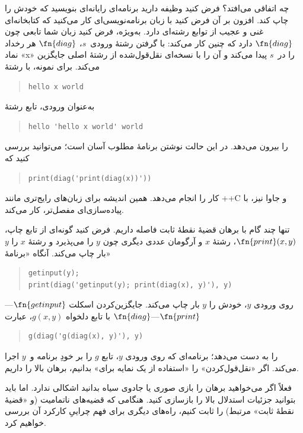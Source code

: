 \documentclass[../../../include/open-logic-section]{subfiles}
\begin{document}
\begin{explain}
چه اتفاقی می‌افتد؟ فرض کنید وظیفه دارید برنامه‌ای رایانه‌ای بنویسید
که خودش را چاپ کند. افزون بر آن فرض کنید با زبان برنامه‌نویسی‌ای کار
می‌کنید که کتابخانه‌ای غنی و عجیب از توابع رشته‌ای دارد. به‌ویژه، فرض
کنید زبان شما تابعی چون $\fn{diag}$ دارد که چنین کار می‌کند: با گرفتن
رشتهٔ ورودی~$s$، $\fn{diag}$ هر رخداد نماد «x» را در~$s$ پیدا می‌کند
و آن را با نسخه‌ای نقل‌قول‌شده از رشتهٔ اصلی جایگزین می‌کند. برای
نمونه، با رشتهٔ
\begin{quote}
\begin{verbatim}
hello x world
\end{verbatim}
\end{quote}
به‌عنوان ورودی، تابع رشتهٔ
\begin{quote}
\begin{verbatim}
hello 'hello x world' world
\end{verbatim}
\end{quote}
را بیرون می‌دهد. در این حالت نوشتن برنامهٔ مطلوب آسان است؛ می‌توانید
بررسی کنید که
\begin{quote}
\begin{verbatim}
print(diag('print(diag(x))'))
\end{verbatim}
\end{quote}
کار را انجام می‌دهد. همین اندیشه برای زبان‌های رایج‌تری مانند ++C و
جاوا نیز، با پیاده‌سازی‌ای مفصل‌تر، کار می‌کند.

تنها چند گام با برهان قضیهٔ نقطهٔ ثابت فاصله داریم. فرض کنید گونه‌ای
از تابع چاپ، $\fn{print}(x,y)$، رشتهٔ $x$ و آرگومان عددی دیگری چون
$y$ را می‌پذیرد و رشتهٔ $x$ را $y$ بار چاپ می‌کند. آنگاه «برنامهٔ»
\begin{quote}
\begin{verbatim}
getinput(y);
print(diag('getinput(y); print(diag(x), y)'), y)
\end{verbatim}
\end{quote}
روی ورودی $y$، خودش را $y$ بار چاپ می‌کند. جایگزین‌کردن اسکلت
$\fn{getinput}$---$\fn{print}$---$\fn{diag}$ با تابع دلخواه
$g(x,y)$، عبارت
\begin{quote}
\begin{verbatim}
g(diag('g(diag(x), y)'), y)
\end{verbatim}
\end{quote}
را به دست می‌دهد؛ برنامه‌ای که روی ورودی $y$، تابع $g$ را بر خودِ
برنامه و~$y$ اجرا می‌کند. اگر «نقل‌قول‌کردن» را «استفاده از یک نمایه
برای» بدانیم، برهان بالا را داریم.

فعلاً اگر می‌خواهید برهان را بازی صوری یا جادوی سیاه بدانید اشکالی
ندارد. اما باید بتوانید جزئیات استدلال بالا را بازسازی کنید. هنگامی
که قضیه‌های ناتمامیت (و «قضیهٔ نقطهٔ ثابت» مرتبط) را ثابت کنیم،
راه‌های دیگری برای فهم چراییِ کارکرد آن بررسی خواهیم کرد.
\end{explain}
\end{document}
